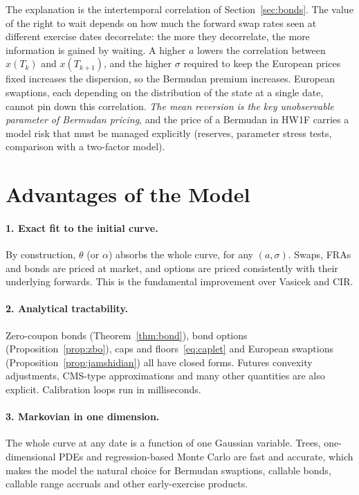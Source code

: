 \documentclass[11pt,a4paper]{article}
\theoremstyle{plain}
\theoremstyle{definition}
\begin{document}
The explanation is the intertemporal correlation of Section~\ref{sec:bonds}. The value of the right to wait depends on how much the forward swap rates seen at different exercise dates decorrelate: the more they decorrelate, the more information is gained by waiting. A higher $a$ lowers the correlation between $x(T_k)$ and $x(T_{k+1})$, and the higher $\sigma$ required to keep the European prices fixed increases the dispersion, so the Bermudan premium increases. European swaptions, each depending on the distribution of the state at a single date, cannot pin down this correlation. \emph{The mean reversion is the key unobservable parameter of Bermudan pricing}, and the price of a Bermudan in HW1F carries a model risk that must be managed explicitly (reserves, parameter stress tests, comparison with a two-factor model).

\clearpage
\section{Advantages of the Model}
\label{sec:advantages}

\paragraph{1. Exact fit to the initial curve.} By construction, $\theta$ (or $\alpha$) absorbs the whole curve, for any $(a,\sigma)$. Swaps, FRAs and bonds are priced at market, and options are priced consistently with their underlying forwards. This is the fundamental improvement over Vasicek and CIR.

\paragraph{2. Analytical tractability.} Zero-coupon bonds (Theorem~\ref{thm:bond}), bond options (Proposition~\ref{prop:zbo}), caps and floors~\eqref{eq:caplet} and European swaptions (Proposition~\ref{prop:jamshidian}) all have closed forms. Futures convexity adjustments, CMS-type approximations and many other quantities are also explicit. Calibration loops run in milliseconds.

\paragraph{3. Markovian in one dimension.} The whole curve at any date is a function of one Gaussian variable. Trees, one-dimensional PDEs and regression-based Monte Carlo are fast and accurate, which makes the model the natural choice for Bermudan swaptions, callable bonds, callable range accruals and other early-exercise products.
\end{document}

